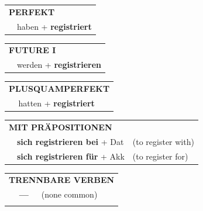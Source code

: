 \documentclass[10pt,a4paper]{revtex4-2}
\begin{document}
\begin{verbbox}
 \begin{tabular}{rl}
     \multicolumn{2}{l}{\textbf{PERFEKT}}\\
   & haben + \textbf{registriert}\\
  \end{tabular}
\hfill
   \begin{tabular}{rl}
    \multicolumn{2}{l}{\textbf{FUTURE I} }\\
   & werden + \textbf{registrieren}\\
  \end{tabular}
\hfill
   \begin{tabular}{rl}
      \multicolumn{2}{l}{\textbf{PLUSQUAMPERFEKT}}\\
   & hatten + \textbf{registriert}\\
  \end{tabular}

   \vspace{10pt}

   \begin{tabular}{lll}
      \multicolumn{3}{l}{\textbf{MIT PRÄPOSITIONEN}}\\
& \textbf{sich registrieren bei} + Dat & (to register with)\\
& \textbf{sich registrieren für} + Akk & (to register for)\\
\end{tabular}
  \hfill
   \begin{tabular}{lll}
      \multicolumn{3}{l}{\textbf{TRENNBARE VERBEN}}\\
 & \textbf{---} & (none common)\\
\vspace{10pt}
  \end{tabular}

  \vspace{-5pt}

\end{verbbox}
\end{document}
